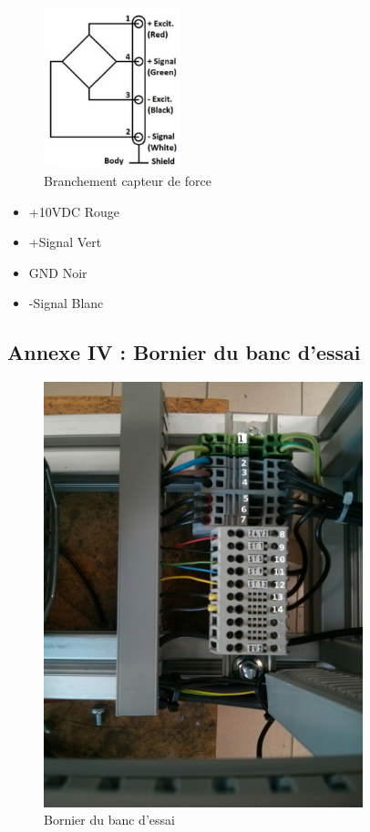 \documentclass[11pt]{article}
\begin{document}
\begin{figure}[!h]
    \centering
    \includegraphics[width=150px]{cablage_fn3060.png}
    \caption{Branchement capteur de force}
\end{figure}

\begin{itemize}
	\item +10VDC  Rouge
	\item +Signal Vert
	\item GND     Noir
	\item -Signal Blanc
\end{itemize}

\newpage

\subsection{Annexe IV : Bornier du banc d'essai}

\begin{figure}[!h]
    \centering
    \includegraphics[width=350px]{bornier_banc.jpg}
    \caption{Bornier du banc d'essai}
\end{figure}
\end{document}
